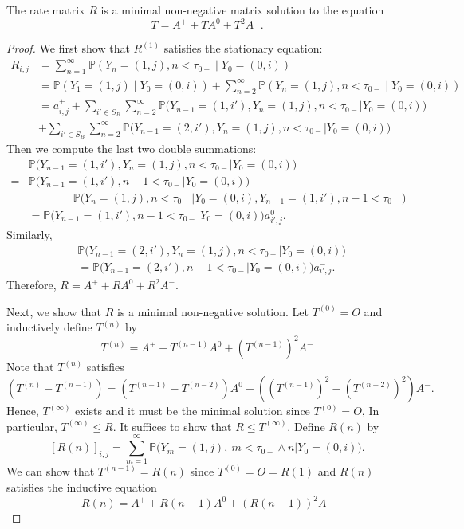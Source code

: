 \begin{proposition}
The rate matrix $R$ is a minimal non-negative matrix solution to the equation
\[
T=A^+ + TA^0 + T^2A^-.
\]
\end{proposition}
\begin{proof}
We first show that $R^{(1)}$ satisfies the stationary equation:
\begin{align*}
R_{i,j}&=\sum_{n=1}^\infty\mathbb{P}\left(
Y_n=(1,j), n<\tau_{0-}\middle| Y_0=(0,i)
\right)\\
&=\mathbb{P}\left(
Y_1=(1,j)\middle| Y_0=(0,i)
\right)+\sum_{n=2}^\infty\mathbb{P}\left(
Y_n=(1,j), n<\tau_{0-}\middle| Y_0=(0,i)
\right)\\
&=a_{i,j}^++\sum_{i'\in S_B}\sum_{n=2}^\infty
\mathbb{P}\bigg(
Y_{n-1}=(1,i'),
Y_n=(1,j), n<\tau_{0-}\bigg| Y_0=(0,i)
\bigg)\\
&+\sum_{i'\in S_B}\sum_{n=2}^\infty
\mathbb{P}\bigg(
Y_{n-1}=(2,i'),
Y_n=(1,j), n<\tau_{0-}\bigg| Y_0=(0,i)
\bigg)
\end{align*}
Then we compute the last two double summations:
\begin{align*}
&\mathbb{P}\bigg(
Y_{n-1}=(1,i'),
Y_n=(1,j), n<\tau_{0-}\bigg| Y_0=(0,i)
\bigg)\\
=&
\mathbb{P}\bigg(
Y_{n-1}=(1,i'),
n-1<\tau_{0-}\bigg| Y_0=(0,i)
\bigg)\\&\qquad\qquad
\mathbb{P}\bigg(
Y_n=(1,j), n<\tau_{0-}\bigg| Y_0=(0,i), Y_{n-1}=(1,i'), n-1<\tau_{0-}
\bigg)\\
&=\mathbb{P}\bigg(
Y_{n-1}=(1,i'),
n-1<\tau_{0-}\bigg| Y_0=(0,i)
\bigg)a_{i',j}^0.
\end{align*}
Similarly, 
\begin{align*}
&\mathbb{P}\bigg(
Y_{n-1}=(2,i'),
Y_n=(1,j), n<\tau_{0-}\bigg| Y_0=(0,i)
\bigg)\\
&=
\mathbb{P}\bigg(
Y_{n-1}=(2,i'),
n-1<\tau_{0-}\bigg| Y_0=(0,i)
\bigg)a_{i',j}^-.
\end{align*}
Therefore, $R=A^+ + RA^0 + R^2A^-$.

Next, we show that $R$ is a minimal non-negative solution.
Let $T^{(0)}=O$ and inductively define $T^{(n)}$ by
\[
T^{(n)}=A^+ + T^{(n-1)}A^0 + (T^{(n-1)})^2A^-
\]
Note that $T^{(n)}$ satisfies 
\[
(T^{(n)} - T^{(n-1)}) = (T^{(n-1)} - T^{(n-2)}) A^0 + ((T^{(n-1)})^2 - (T^{(n-2)})^2)A^-.
\]
Hence, $T^{(\infty)}$ exists and it must be the minimal solution since $T^{(0)}=O$,
In particular, $T^{(\infty)}\le R$. It suffices to show that $R\le T^{(\infty)}$.
Define $R(n)$ by
\[
[R(n)]_{i,j}=\sum_{m=1}^\infty\mathbb{P}\bigg(
Y_m=(1,j),~m<\tau_{0-}\land n\bigg| Y_0=(0,i)
\bigg).
\]
We can show that $T^{(n-1)}=R(n)$ since $T^{(0)}=O=R(1)$ and $R(n)$ satisfies the inductive equation
\[
R(n) =A^+ + R(n-1)A^0 + (R(n-1))^2A^-
\]
\end{proof}

